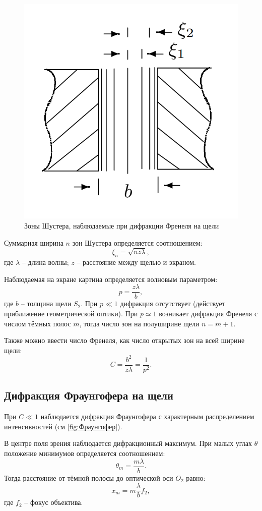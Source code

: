 \documentclass[a4paper, 12pt]{article}
\begin{document}
\begin{figure}[h!]
	\centering
	\includegraphics[width=0.5\linewidth]{1.png}
	\caption{Зоны Шустера, наблюдаемые при дифракции Френеля на щели}
	\label{fig:ШустерЗоны}
\end{figure}

Суммарная ширина $ n $ зон Шустера определяется соотношением:
\begin{equation}\label{eq:шустерзоны}
	\xi_n = \sqrt{n z \lambda},
\end{equation}
где $ \lambda $ -- длина волны; $ z $ -- расстояние между щелью и экраном.

Наблюдаемая на экране картина определяется волновым параметром:
\begin{equation}\label{eq:волновойПараметр}
	p = \frac{z \lambda}{b},
\end{equation}
где $ b $ -- толщина щели $ S_2 $. При $ p\ll 1 $ дифракция отсутствует (действует приближение геометрической оптики). При $ p\simeq 1 $ возникает дифракция Френеля с числом тёмных полос $ m $, тогда число зон на полуширине щели $ n = m+1 $.

Также можно ввести число Френеля, как число открытых зон на всей ширине щели:
\begin{equation}\label{eq:числоФренеля}
	C = \frac{b^2}{z \lambda} = \frac{1}{p^2}.
\end{equation}

\subsection{Дифракция Фраунгофера на щели}

При $ C\ll 1  $ наблюдается дифракция Фраунгофера с характерным распределением интенсивностей (см \ref{fig:Фраунгофер}). 

В центре поля зрения наблюдается дифракционный максимум. При малых углах $ \theta $ положение минимумов определяется соотношением:
\begin{equation*}\label{key}
	\theta_m = \frac{m \lambda}{b}.
\end{equation*}
Тогда расстояние от тёмной полосы до оптической оси $ O_2 $ равно:
\begin{equation}\label{eq:ФраунгоферМинимумы}
	x_m = m \frac{\lambda}{b} f_2,
\end{equation}
где $ f_2 $ -- фокус объектива.
\end{document}

